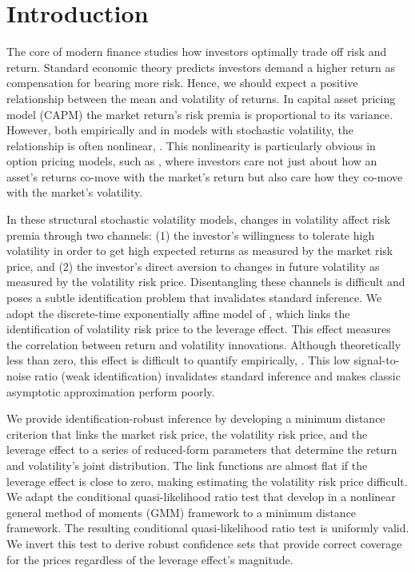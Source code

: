 \documentclass[11pt, letterpaper, twoside]{article}
\begin{document}
\tableofcontents
\clearpage

\section{Introduction}

The core of modern finance studies how investors optimally trade off risk and return. Standard economic theory predicts investors demand a higher return as compensation for bearing more risk. Hence, we should expect a positive relationship between the mean and volatility of returns. In  capital asset pricing model (CAPM) the market return's risk premia is proportional to its variance. However, both empirically and in models with stochastic volatility, the relationship is often nonlinear, \parencites{bansal2014volatility, dewbecker2017price}. This nonlinearity is particularly obvious in option pricing models, such as \textcites{bates2008market, christoffersen2013capturing}, where investors care not just about how an asset's returns co-move with the market's return but also care how they co-move with the market's volatility.

In these structural stochastic volatility models, changes in volatility affect risk premia through two channels: (1) the investor's willingness to tolerate high volatility in order to get high expected returns as measured by the market risk price, and (2) the investor’s direct aversion to changes in future volatility as measured by the volatility risk price. Disentangling these channels is difficult and poses a subtle identification problem that invalidates standard inference. We adopt the discrete-time exponentially affine model of \textcite{han2018leverage}, which links the identification of volatility risk price to the leverage effect. This effect measures the correlation between return and volatility innovations. Although theoretically less than zero, this effect is difficult to quantify empirically, \parencites{bandi2012timevarying, aitsahalia2013leverage}. This low signal-to-noise ratio (weak identification) invalidates standard inference and makes classic asymptotic approximation perform poorly.

We provide identification-robust inference by developing a minimum distance criterion that links the market risk price, the volatility risk price, and the leverage effect to a series of reduced-form parameters that determine the return and volatility's joint distribution. The link functions are almost flat if the leverage effect is close to zero, making estimating the volatility risk price difficult. We adapt the conditional quasi-likelihood ratio test that \textcite{andrews2016conditional} develop in a nonlinear general method of moments (GMM) framework to a minimum distance framework. The resulting conditional quasi-likelihood ratio test is uniformly valid. We invert this test to derive robust confidence sets that provide correct coverage for the prices regardless of the leverage effect's magnitude. 
\end{document}
